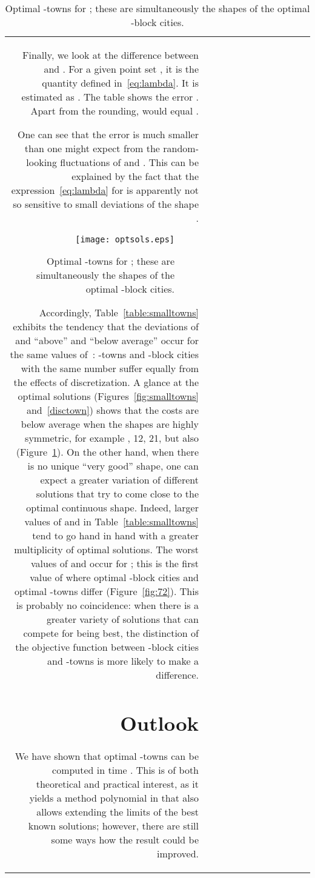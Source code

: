 \documentclass[preprint,authoryear,12pt]{elsarticle}
\begin{document}
\begin{table}
{\begin{tabular}{|r|rr|rr|r||r|rr|rr|r|}
{Finally, we look at
the difference between  and .
For a given point set , it is the quantity 
defined in~\eqref{eq:lambda}.  It is estimated as .
The table shows the error
 .
Apart from the rounding,  would equal .

One can see that the error  is much smaller than one might
expect from the random-looking fluctuations of  and .
This can be explained by the fact that the expression~\eqref{eq:lambda}
 for 
is apparently not so sensitive to small deviations of the shape .




\begin{figure}[t]
\begin{center}
\texttt{[image: optsols.eps]} \caption{Optimal
-towns for ; these are simultaneously the shapes of
the optimal -block cities.}
\label{optsols}
\end{center}
\end{figure}

Accordingly, Table~\ref{table:smalltowns} exhibits the tendency
that the deviations of  and 
``above'' and ``below average'' occur for the same values of~:
-towns and -block cities with the same number  suffer
equally from the effects of discretization.
A glance at the optimal solutions (Figures~\ref{fig:smalltowns}
and~\ref{disctown})
shows that
the costs are
below average when the shapes are highly symmetric, for example
, 12, 21, but also   (Figure~\ref{optsols}).
On the other hand, when there is no unique ``very good'' shape, one
can expect a greater variation of different solutions that try to come
close to the optimal continuous shape.  Indeed, larger values of 
and  in Table~\ref{table:smalltowns} tend to go hand in hand with
a greater multiplicity of optimal solutions. The worst values of 
and  occur for ; this is the first value of  where optimal
-block cities and optimal -towns differ (Figure~\ref{fig:72}).
This is probably no coincidence:
when there is a greater variety of solutions that can compete for being
best, the distinction of the objective function between -block
cities and -towns is more likely to make a difference.

\section{Outlook}
\label{sec:outlook}

We have shown that optimal -towns can be computed
in time . This is of both theoretical and practical
interest, as it yields a method polynomial in  that also allows extending
the limits of the best known solutions; however,
there are still some ways how the result could be improved.

}
\end{tabular}}
\end{table}
\end{document}
